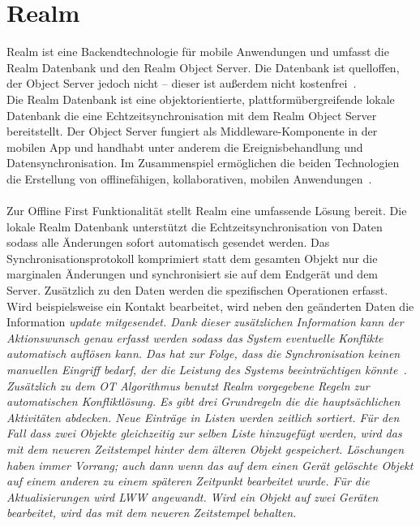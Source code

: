 \section{\label{sub:realm}Realm}
Realm ist eine Backendtechnologie für mobile Anwendungen und umfasst die Realm Datenbank und den Realm Object Server. Die Datenbank ist quelloffen, der Object Server jedoch nicht -- dieser ist außerdem nicht kostenfrei~\cite{realm}.\\
Die Realm Datenbank ist eine objektorientierte, plattformübergreifende lokale Datenbank die eine Echtzeitsynchronisation mit dem Realm Object Server bereitstellt.
Der Object Server fungiert als \gls{Middleware}-Komponente in der mobilen \gls{App} und handhabt unter anderem die Ereignisbehandlung und Datensynchronisation. Im Zusammenspiel ermöglichen die beiden Technologien die Erstellung von offlinefähigen, kollaborativen, mobilen Anwendungen~\cite{realm_whitepaper}.\\\\
Zur Offline First Funktionalität stellt Realm eine umfassende Lösung bereit.
Die lokale Realm Datenbank unterstützt die Echtzeitsynchronisation von Daten sodass alle Änderungen sofort automatisch gesendet werden. Das Synchronisationsprotokoll komprimiert statt dem gesamten Objekt nur die marginalen Änderungen und synchronisiert sie auf dem Endgerät und dem Server. Zusätzlich zu den Daten werden die spezifischen Operationen erfasst. 
Wird beispielsweise ein Kontakt bearbeitet, wird neben den geänderten Daten die Information \it{update} mitgesendet.
Dank dieser zusätzlichen Information kann der Aktionswunsch genau erfasst werden sodass das System eventuelle Konflikte automatisch auflösen kann. Das hat zur Folge, dass die Synchronisation keinen manuellen Eingriff bedarf, der die Leistung des Systems beeinträchtigen könnte~\cite{realm_offline_whitepaper}.\\
Zusätzlich zu dem \gls{OT} Algorithmus benutzt Realm vorgegebene Regeln zur automatischen Konfliktlösung. Es gibt drei Grundregeln die die hauptsächlichen Aktivitäten abdecken. Neue Einträge in Listen werden zeitlich sortiert. Für den Fall dass zwei Objekte gleichzeitig zur selben Liste hinzugefügt werden, wird das mit dem neueren Zeitstempel hinter dem älteren Objekt gespeichert.
Löschungen haben immer Vorrang; auch dann wenn das auf dem einen Gerät gelöschte Objekt auf einem anderen zu einem späteren Zeitpunkt bearbeitet wurde. Für die Aktualisierungen wird \gls{LWW} angewandt. Wird ein Objekt auf zwei Geräten bearbeitet, wird das mit dem neueren Zeitstempel behalten.\\ 
